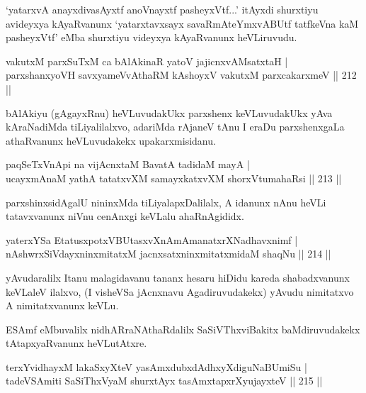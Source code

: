 \begin{artha}
`yatarxvA anayxdivasAyxtf anoV\s nayxtf pasheyxVtf...' itAyxdi shurxtiyu avideyxya kAyaRvanunx `yatarxtavxsayx savaRmAteYmxvABUtf tatfkeVna kaM pasheyxVtf' eMba shurxtiyu videyxya kAyaRvanunx heVLiruvudu.
\end{artha}

\begin{shl}
vakutxM parxSuTxM ca bAlAkinaR yatoV jajicnxvAMsatxtaH |\\
parxshanxyoVH savxyameVvAthaRM kAshoyxV vakutxM parxcakarxmeV \hfill || 212 ||
\end{shl}

\begin{artha}
bAlAkiyu (gAgayxRnu) heVLuvudakUkx parxshenx keVLuvudakUkx yAva kAraNa\-diMda tiLiyalilalxvo, adariMda rAjaneV tAnu I eraDu parxshenxgaLa athaRvanunx heVLuvudakekx upakarxmisidanu.
\end{artha}

\begin{shl}
paqSeTxVnApi na vijAcnxtaM BavatA tadidaM mayA |\\
ucayxmAnaM yathA tatatxvXM samayxkatxvXM shorxVtumahaRsi \hfill || 213 ||
\end{shl}

\begin{artha}
parxshinxsidAgalU nininxMda tiLiyalapxDalilalx, A idanunx nAnu heVLi tatavxvanunx niVnu cenAnxgi keVLalu ahaRnAgididx.
\end{artha}


\begin{shl}
yaterxYSa EtatusxpotxV\s BUtasxvXnAmAmanatxrXNadhavxnimf |\\
nAshwrxSiVdayxninxmitatxM jacnxsatxninxmitatxmidaM shaqNu \hfill || 214 ||
\end{shl}

\begin{artha}
yAvudaralilx Itanu malagidavanu tananx hesaru hiDidu kareda shabadxvanunx keVLaleV ilalxvo, (I visheVSa jAcnxnavu Agadiruvudakekx) yAvudu nimitatxvo A nimitatxvanunx keVLu.
\end{artha}

\begin{artha}
ESAmf eMbuvalilx nidhARraNAthaRdalilx SaSiVThxviBakitx baMdiruvudakekx tAtapxyaR\-vanunx heVLutAtxre.
\end{artha}

\begin{shl}
terxYvidhayxM lakaSxyXteV yasAmxdubxdAdhxyXdiguNaBUmiSu |\\
tadeVSAmiti SaSiThxVyaM shurxtAyx tasAmxtapxrXyujayxteV \hfill || 215 ||
\end{shl}

